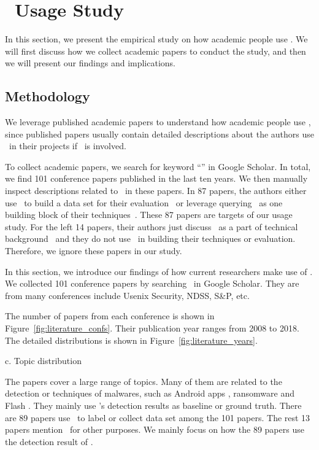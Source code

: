 \section{\vt\ Usage Study}

In this section, we present the empirical study on how 
academic people use \vt. 
We will first discuss how we collect academic papers to conduct the study, 
and then we will present our findings and implications. 

\subsection{Methodology}

We leverage published academic papers to understand 
how academic people use \vt,
since published papers usually contain detailed descriptions 
about the authors use \vt\ in their projects if \vt\ is involved. 

To collect academic papers, we search for keyword ``\vt'' in Google Scholar. 
In total, we find 101 conference papers published in the last ten years.
We then manually inspect descriptions related to \vt\ in these papers. 
In 87 papers, the authors either use \vt\ to build a data set for their evaluation~\cite{} 
or leverage querying \vt\ as one building block of their
techniques~\cite{vt-component-1,vt-component-2,vt-component-3}. 
These 87 papers are targets of our \vt{} usage study. 
For the left 14 papers, their authors just discuss \vt\ as a part 
of technical background~\cite{not-use-1,bayer2009scalable,jiang2012dissecting} and 
they do not use \vt\ in building their techniques or evaluation. 
Therefore, we ignore these papers in our study. 






In this section, we introduce our findings of how current researchers make use of \vt. 
We collected 101 conference papers by searching \vt\ in Google Scholar. 
They are from many conferences include Usenix Security, NDSS, S\&P, etc. 

%

The number of papers from each conference is shown in Figure~\ref{fig:literature_confs}. 
Their publication year ranges from 2008 to 2018. The detailed distributions is shown in Figure~\ref{fig:literature_years}.

c. Topic distribution 

The papers cover a large range of topics. 
Many of them are related to the detection or techniques of malwares, such as Android apps \cite{arp2014drebin,huangvt2016bigdata}, ransomware \cite{kharraz2016unveil} and Flash \cite{ford2009analyzing}. 
They mainly use \vt's detection results as baseline or ground truth. 
There are 89 papers use \vt\ to label or collect data set among the 101 papers. 
The rest 13 papers mention \vt\ for other purposes. 
We mainly focus on how the 89 papers use the detection result of \vt.

